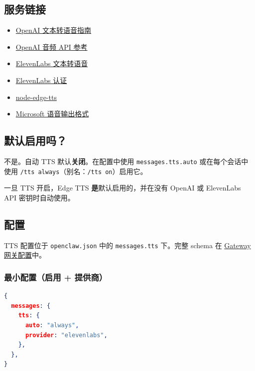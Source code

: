 \subsection{服务链接}


\begin{itemize}
  \item \href{https://platform.openai.com/docs/guides/text-to-speech}{OpenAI 文本转语音指南}
  \item \href{https://platform.openai.com/docs/api-reference/audio}{OpenAI 音频 API 参考}
  \item \href{https://elevenlabs.io/docs/api-reference/text-to-speech}{ElevenLabs 文本转语音}
  \item \href{https://elevenlabs.io/docs/api-reference/authentication}{ElevenLabs 认证}
  \item \href{https://github.com/SchneeHertz/node-edge-tts}{node-edge-tts}
  \item \href{https://learn.microsoft.com/azure/ai-services/speech-service/rest-text-to-speech\#audio-outputs}{Microsoft 语音输出格式}
\end{itemize}


\subsection{默认启用吗？}


不是。自动 TTS 默认\textbf{关闭}。在配置中使用 \texttt{messages.tts.auto} 或在每个会话中使用 \texttt{/tts always}（别名：\texttt{/tts on}）启用它。

一旦 TTS 开启，Edge TTS \textbf{是}默认启用的，并在没有 OpenAI 或 ElevenLabs API 密钥时自动使用。

\subsection{配置}


TTS 配置位于 \texttt{openclaw.json} 中的 \texttt{messages.tts} 下。完整 schema 在 \href{/gateway/configuration}{Gateway 网关配置}中。

\subsubsection{最小配置（启用 + 提供商）}


\begin{lstlisting}[language=json]
{
  messages: {
    tts: {
      auto: "always",
      provider: "elevenlabs",
    },
  },
}
\end{lstlisting}


